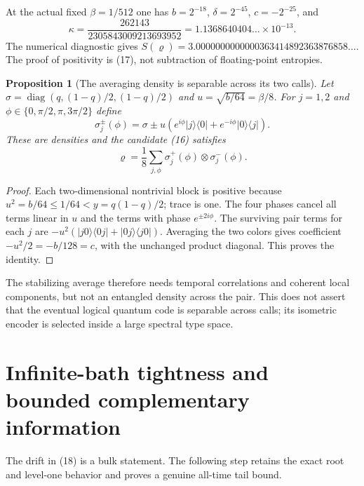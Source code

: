 \documentclass[11pt]{article}
\newtheorem{proposition}[theorem]{Proposition}
\begin{document}
At the actual fixed $\beta=1/512$ one has
$b=2^{-18}$, $\delta=2^{-45}$, $c=-2^{-25}$, and
\[
 \kappa=\frac{262143}{2305843009213693952}
   =1.1368640404\ldots\times10^{-13}.
 \tag{21}
\]
The numerical diagnostic gives
$S(\varrho)=3.0000000000000363414892363876858\ldots$.
The proof of positivity is (17), not subtraction of floating-point entropies.

\begin{proposition}[The averaging density is separable across its two calls]
\label{prop:separable}
Let $\sigma=\operatorname{diag}(q,(1-q)/2,(1-q)/2)$ and
$u=\sqrt{b/64}=\beta/8$. For $j=1,2$ and
$\phi\in\{0,\pi/2,\pi,3\pi/2\}$ define
\[
 \sigma_j^\pm(\phi)=\sigma\pm u
 (e^{i\phi}|j\rangle\langle0|+e^{-i\phi}|0\rangle\langle j|).
\]
These are densities and the candidate (16) satisfies
\[
 \varrho=\frac18\sum_{j,\phi}\sigma_j^+(\phi)\otimes\sigma_j^-(\phi).
 \tag{21a}
\]
\end{proposition}
\begin{proof}
Each two-dimensional nontrivial block is positive because
$u^2=b/64\le1/64<y=q(1-q)/2$; trace is one.
The four phases cancel all terms linear in $u$ and the terms with phase
$e^{\pm2i\phi}$. The surviving pair terms for each $j$ are
$-u^2(|j0\rangle\langle0j|+|0j\rangle\langle j0|)$.
Averaging the two colors gives coefficient $-u^2/2=-b/128=c$, with the
unchanged product diagonal. This proves the identity.
\end{proof}

The stabilizing average therefore needs temporal correlations and coherent
local components, but not an entangled density across the pair. This does
not assert that the eventual logical quantum code is separable across calls;
its isometric encoder is selected inside a large spectral type space.

\section{Infinite-bath tightness and bounded complementary information}

The drift in (18) is a bulk statement. The following step retains the exact
root and level-one behavior and proves a genuine all-time tail bound.
\end{document}
